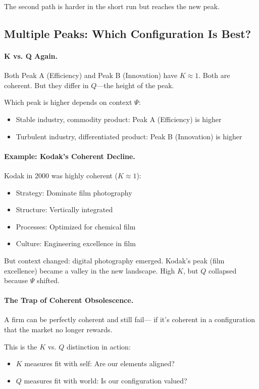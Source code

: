 \documentclass[12pt,a4paper]{article}
\begin{document}
The second path is harder in the short run but reaches the new peak.

\subsection{Multiple Peaks: Which Configuration Is Best?}

\paragraph{K vs. Q Again.}
Both Peak A (Efficiency) and Peak B (Innovation) have $K \approx 1$.
Both are coherent. But they differ in $Q$---the height of the peak.

Which peak is higher depends on context $\Psi$:
\begin{itemize}
  \item Stable industry, commodity product: Peak A (Efficiency) is higher
  \item Turbulent industry, differentiated product: Peak B (Innovation) is higher
\end{itemize}

\paragraph{Example: Kodak's Coherent Decline.}
Kodak in 2000 was highly coherent ($K \approx 1$):
\begin{itemize}
  \item Strategy: Dominate film photography
  \item Structure: Vertically integrated
  \item Processes: Optimized for chemical film
  \item Culture: Engineering excellence in film
\end{itemize}

But context changed: digital photography emerged.
Kodak's peak (film excellence) became a valley in the new landscape.
High $K$, but $Q$ collapsed because $\Psi$ shifted.

\paragraph{The Trap of Coherent Obsolescence.}
A firm can be perfectly coherent and still fail---
if it's coherent in a configuration that the market no longer rewards.

This is the $K$ vs. $Q$ distinction in action:
\begin{itemize}
  \item $K$ measures fit with self: Are our elements aligned?
  \item $Q$ measures fit with world: Is our configuration valued?
\end{itemize}
\end{document}
